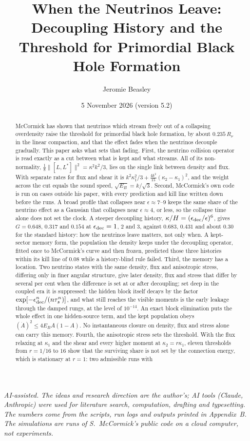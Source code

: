\documentclass[11pt]{article}
\title{When the Neutrinos Leave:\\ Decoupling History and the Threshold for Primordial Black Hole Formation}
\author{Jeromie Beasley}
\date{5 November 2026 \quad (version 5.2)}
\begin{document}
\maketitle

\noindent\emph{AI-assisted. The ideas and research direction are the author's; AI tools (Claude, Anthropic) were used for literature search, computation, drafting and typesetting. The numbers come from the scripts, run logs and outputs printed in Appendix~B. The simulations are runs of S.~McCormick's public code on a cloud computer, not experiments.}

\begin{abstract}
McCormick has shown that neutrinos which stream freely out of a collapsing overdensity raise the threshold for primordial black hole formation, by about $0.235\,R_\nu$ in the linear compaction, and that the effect fades when the neutrinos decouple gradually. This paper asks what sets that fading. First, the neutrino collision operator is read exactly as a cut between what is kept and what streams. All of its non-normality, $\tfrac18\lVert[L,L^\ast]\rVert^2=\kappa^2k^2/3$, lies on the single link between density and flux. With separate rates for flux and shear it is $k^2\kappa_1^2/3+\tfrac{4k^2}{15}(\kappa_2-\kappa_1)^2$, and the weight across the cut equals the sound speed, $\sqrt{E_B}=k/\sqrt3$. Second, McCormick's own code is run on cases outside his paper, with every prediction and kill line written down before the runs. A broad profile that collapses near $\epsilon\approx7$--$9$ keeps the same share of the neutrino effect as a Gaussian that collapses near $\epsilon\approx4$, or less, so the collapse time alone does not set the clock. A steeper decoupling history, $\kappa/H=(\epsilon_{\rm dec}/\epsilon)^6$, gives $G=0.648$, $0.317$ and $0.154$ at $\epsilon_{\rm dec}=1$, $2$ and $3$, against $0.683$, $0.431$ and about $0.30$ for the standard history: how the neutrinos leave matters, not only when. A kept-sector memory form, the population the density keeps under the decoupling operator, fitted once to McCormick's curve and then frozen, predicted those three histories within its kill line of $0.08$ while a history-blind rule failed. Third, the memory has a location. Two neutrino states with the same density, flux and anisotropic stress, differing only in finer angular structure, give later density, flux and stress that differ by several per cent when the difference is set at or after decoupling; set deep in the coupled era it is suppressed: the hidden block itself decays by the factor $\exp[-\epsilon_{\rm dec}^n/(n\tau_s^n)]$, and what still reaches the visible moments is the early leakage through the damped rungs, at the level of $10^{-14}$. An exact block elimination puts the whole effect in one hidden-source term, and the kept population obeys $(\dot A)^2\le4E_BA(1-A)$. No instantaneous closure on density, flux and stress alone can carry this memory. Fourth, the anisotropic stress sets the threshold. With the flux relaxing at $\kappa_1$ and the shear and every higher moment at $\kappa_2=r\kappa_1$, eleven thresholds from $r=1/16$ to $16$ show that the surviving share is not set by the connection energy, which is stationary at $r=1$: two admissible runs with 
\end{abstract}
\end{document}
